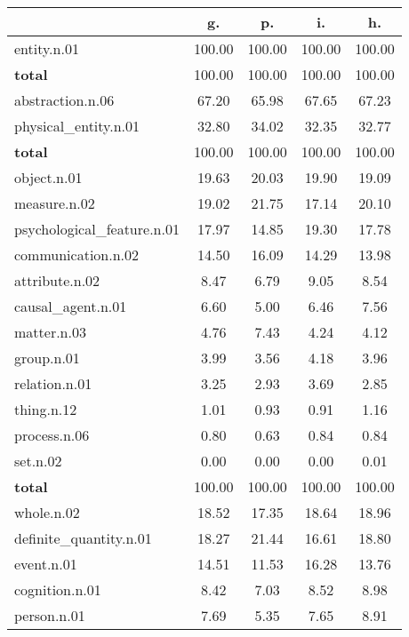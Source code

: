 \begin{table}[h!]
\begin{center}
\begin{tabular}{| l || c | c | c | c |}\hline
 & {\bf g.} & {\bf p.} & {\bf i.} & {\bf h.} \\\hline\hline
entity.n.01 & 100.00  & 100.00  & 100.00  & 100.00 \\\hline\hline
{{\bf total}} & 100.00  & 100.00  & 100.00  & 100.00 \\\hline\hline\hline
abstraction.n.06 & 67.20  & 65.98  & 67.65  & 67.23 \\\hline
physical\_entity.n.01 & 32.80  & 34.02  & 32.35  & 32.77 \\\hline\hline
{{\bf total}} & 100.00  & 100.00  & 100.00  & 100.00 \\\hline\hline\hline
object.n.01 & 19.63  & 20.03  & 19.90  & 19.09 \\\hline
measure.n.02 & 19.02  & 21.75  & 17.14  & 20.10 \\\hline
psychological\_feature.n.01 & 17.97  & 14.85  & 19.30  & 17.78 \\\hline
communication.n.02 & 14.50  & 16.09  & 14.29  & 13.98 \\\hline
attribute.n.02 & 8.47  & 6.79  & 9.05  & 8.54 \\\hline
causal\_agent.n.01 & 6.60  & 5.00  & 6.46  & 7.56 \\\hline
matter.n.03 & 4.76  & 7.43  & 4.24  & 4.12 \\\hline
group.n.01 & 3.99  & 3.56  & 4.18  & 3.96 \\\hline
relation.n.01 & 3.25  & 2.93  & 3.69  & 2.85 \\\hline
thing.n.12 & 1.01  & 0.93  & 0.91  & 1.16 \\\hline
process.n.06 & 0.80  & 0.63  & 0.84  & 0.84 \\\hline
set.n.02 & 0.00  & 0.00  & 0.00  & 0.01 \\\hline\hline
{{\bf total}} & 100.00  & 100.00  & 100.00  & 100.00 \\\hline\hline\hline
whole.n.02 & 18.52  & 17.35  & 18.64  & 18.96 \\\hline
definite\_quantity.n.01 & 18.27  & 21.44  & 16.61  & 18.80 \\\hline
event.n.01 & 14.51  & 11.53  & 16.28  & 13.76 \\\hline
cognition.n.01 & 8.42  & 7.03  & 8.52  & 8.98 \\\hline
person.n.01 & 7.69  & 5.35  & 7.65  & 8.91 \\\hline

\end{tabular}
\end{center}
\end{table}
